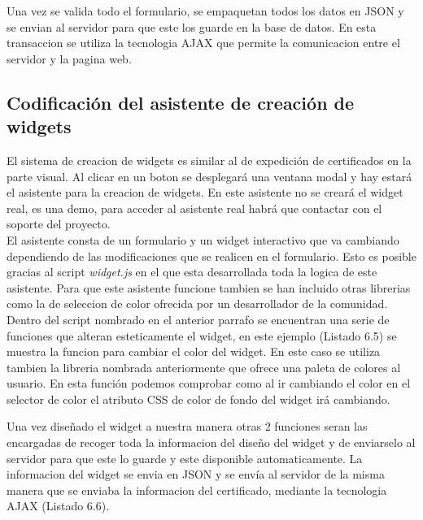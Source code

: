 
Una vez se valida todo el formulario, se empaquetan todos los datos en JSON y se envian al servidor para que este los guarde en la base de datos. En esta transaccion se utiliza la tecnologia AJAX\cite{wsdl14} que permite la comunicacion entre el servidor y la pagina web.\\


\subsection{Codificación del asistente de creación de widgets}
El sistema de creacion de widgets es similar al de expedición de certificados en la parte visual. Al clicar en un boton se desplegará una ventana modal y hay estará el asistente para la creacion de widgets. En este asistente no se creará el widget real, es una demo, para acceder al asistente real habrá que contactar con el soporte del proyecto.\\

El asistente consta de un formulario y un widget interactivo que va cambiando dependiendo de las modificaciones que se realicen en el formulario. Esto es posible gracias al script \textit{widget.js} en el que esta desarrollada toda la logica de este asistente. Para que este asistente funcione tambien se han incluido otras librerias como la de seleccion de color\cite{wsdl15} ofrecida por un desarrollador de la comunidad.\\

Dentro del script nombrado en el anterior parrafo se encuentran una serie de funciones que alteran esteticamente el widget, en este ejemplo (Listado 6.5) se muestra la funcion para cambiar el color del widget. En este caso se utiliza tambien la libreria nombrada anteriormente que ofrece una paleta de colores al usuario.  En esta función podemos comprobar como al ir cambiando el color en el selector de color el atributo CSS de color de fondo del widget irá cambiando.\\


Una vez diseñado el widget a nuestra manera otras 2 funciones seran las encargadas de recoger toda la informacion del diseño del widget y de enviarselo al servidor para que este lo guarde y este disponible automaticamente. La informacion del widget se envia en JSON y se envía al servidor de la misma manera que se enviaba la informacion del certificado, mediante la tecnologia AJAX (Listado 6.6).\\


